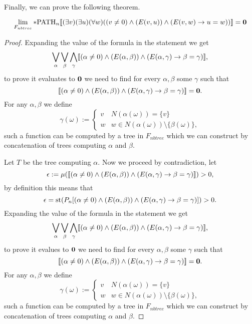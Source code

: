 Finally, we can prove the following theorem.

\begin{thrm}\label{thrmnoend}
\[\lim_{F_{nbtree}}*\text{PATH}_n[\![(\exists v)(\exists u)(\forall w)((v\not=0)\land (E(v,u)) \land(E(v,w) \to u=w))]\!]=\textbf{0}\]
\end{thrm}
\begin{proof}
Expanding the value of the formula in the statement we get
\[\bigvee_{\alpha}\bigvee_{\beta}\bigwedge_{\gamma}[\![(\alpha\not=0)\land (E(\alpha,\beta)) \land(E(\alpha,\gamma) \to \beta=\gamma)]\!],\]
to prove it evaluates to $\textbf{0}$ we need to find for every $\alpha,\beta$ some $\gamma$ such that
\[[\![(\alpha\not=0)\land (E(\alpha,\beta)) \land(E(\alpha,\gamma) \to \beta=\gamma)]\!]=\textbf{0}.\]
For any $\alpha,\beta$ we define
\[\gamma(\omega):=\begin{cases}v&N(\alpha(\omega))=\{v\}\\w&w\in N(\alpha(\omega))\setminus\{\beta(\omega)\},\end{cases}\]
such a function can be computed by a tree in $F_{nbtree}$ which we can construct by concatenation of trees computing $\alpha$ and $\beta$.

Let $T$ be the tree computing $\alpha$. Now we proceed by contradiction, let
\[\epsilon:=\mu([\![(\alpha\not=0)\land (E(\alpha,\beta)) \land(E(\alpha,\gamma) \to \beta=\gamma)]\!])>0,\]
by definition this means that
\[\epsilon=\text{st}(P_n[(\alpha\not=0)\land (E(\alpha,\beta)) \land(E(\alpha,\gamma) \to \beta=\gamma)])>0.\]
Expanding the value of the formula in the statement we get
\[\bigvee_{\alpha}\bigvee_{\beta}\bigwedge_{\gamma}[\![(\alpha\not=0)\land (E(\alpha,\beta)) \land(E(\alpha,\gamma) \to \beta=\gamma)]\!],\]
to prove it evalues to $\textbf{0}$ we need to find for every $\alpha,\beta$ some $\gamma$ such that
\[[\![(\alpha\not=0)\land (E(\alpha,\beta)) \land(E(\alpha,\gamma) \to \beta=\gamma)]\!]=\textbf{0}.\]
For any $\alpha,\beta$ we define
\[\gamma(\omega):=\begin{cases}v&N(\alpha(\omega))=\{v\}\\w&w\in N(\alpha(\omega))\setminus\{\beta(\omega)\},\end{cases}\]
such a function can be computed by a tree in $F_{nbtree}$ which we can construct by concatenation of trees computing $\alpha$ and $\beta$.


\end{proof}
